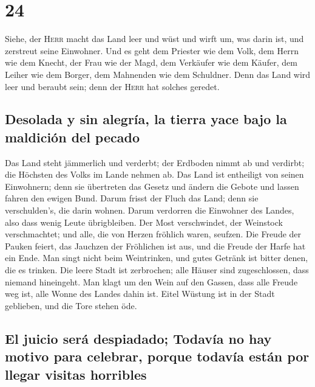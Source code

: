 \hypertarget{section-23}{%
\section{24}\label{section-23}}

 Siehe, der \textsc{Herr} macht das Land leer und wüst und
wirft um, was darin ist, und zerstreut seine Einwohner. 
Und es geht dem Priester wie dem Volk, dem Herrn wie dem Knecht, der
Frau wie der Magd, dem Verkäufer wie dem Käufer, dem Leiher wie dem
Borger, dem Mahnenden wie dem Schuldner.  Denn das Land
wird leer und beraubt sein; denn der \textsc{Herr} hat solches geredet.

\hypertarget{desolada-y-sin-alegruxeda-la-tierra-yace-bajo-la-maldiciuxf3n-del-pecado}{%
\subsection{Desolada y sin alegría, la tierra yace bajo la maldición del
pecado}\label{desolada-y-sin-alegruxeda-la-tierra-yace-bajo-la-maldiciuxf3n-del-pecado}}

 Das Land steht jämmerlich und verderbt; der Erdboden
nimmt ab und verdirbt; die Höchsten des Volks im Lande nehmen ab.
 Das Land ist entheiligt von seinen Einwohnern; denn sie
übertreten das Gesetz und ändern die Gebote und lassen fahren den ewigen
Bund.  Darum frisst der Fluch das Land; denn sie
verschulden's, die darin wohnen. Darum verdorren die Einwohner des
Landes, also dass wenig Leute übrigbleiben.  Der Most
verschwindet, der Weinstock verschmachtet; und alle, die von Herzen
fröhlich waren, seufzen.  Die Freude der Pauken feiert,
das Jauchzen der Fröhlichen ist aus, und die Freude der Harfe hat ein
Ende.  Man singt nicht beim Weintrinken, und gutes Getränk
ist bitter denen, die es trinken.  Die leere Stadt ist
zerbrochen; alle Häuser sind zugeschlossen, dass niemand hineingeht.
 Man klagt um den Wein auf den Gassen, dass alle Freude
weg ist, alle Wonne des Landes dahin ist.  Eitel Wüstung
ist in der Stadt geblieben, und die Tore stehen öde.

\hypertarget{el-juicio-seruxe1-despiadado-todavuxeda-no-hay-motivo-para-celebrar-porque-todavuxeda-estuxe1n-por-llegar-visitas-horribles}{%
\subsection{El juicio será despiadado; Todavía no hay motivo para
celebrar, porque todavía están por llegar visitas
horribles}\label{el-juicio-seruxe1-despiadado-todavuxeda-no-hay-motivo-para-celebrar-porque-todavuxeda-estuxe1n-por-llegar-visitas-horribles}}

